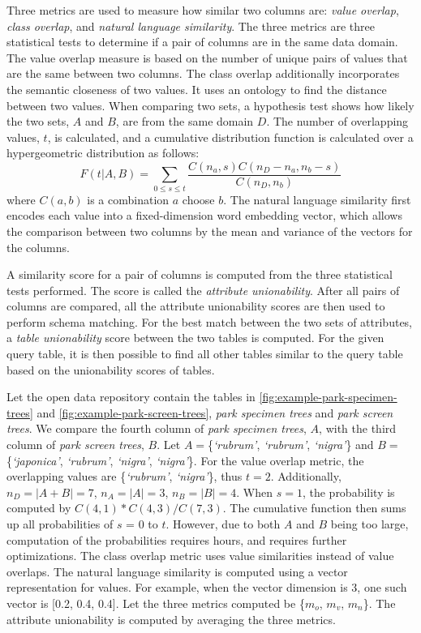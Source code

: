 Three metrics are used to measure how similar two columns are: \textit{value overlap}, \textit{class overlap}, and \textit{natural language similarity}. The three metrics are three statistical tests to determine if a pair of columns are in the same data domain. The value overlap measure is based on the number of unique pairs of values that are the same between two columns. The class overlap additionally incorporates the semantic closeness of two values. It uses an ontology to find the distance between two values. When comparing two sets, a hypothesis test shows how likely the two sets, $A$ and $B$, are from the same domain $D$. The number of overlapping values, $t$, is calculated, and a cumulative distribution function is calculated over a hypergeometric distribution as follows:
\[
F(t|A,B) = \sum\limits _{0\le s\le t}\frac{C(n_{a},s)C(n_{D}-n_{a},n_{b}-s)}{C(n_{D},n_{b})}
\]
where $C(a, b)$ is a combination $a$ choose $b$. The natural language similarity first encodes each value into a fixed-dimension word embedding vector, which allows the comparison between two columns by the mean and variance of the vectors for the columns.

A similarity score for a pair of columns is computed from the three statistical tests performed. The score is called the \textit{attribute unionability}. After all pairs of columns are compared, all the attribute unionability scores are then used to perform schema matching. For the best match between the two sets of attributes, a \textit{table unionability} score between the two tables is computed. For the given query table, it is then possible to find all other tables similar to the query table based on the unionability scores of tables.

Let the open data repository contain the tables in \autoref{fig:example-park-specimen-trees} and \autoref{fig:example-park-screen-trees}, \textit{park specimen trees} and \textit{park screen trees}. We compare the fourth column of \textit{park specimen trees}, $A$, with the third column of \textit{park screen trees}, $B$. Let $A=$\{\textit{`rubrum'}, \textit{`rubrum'}, \textit{`nigra'}\} and $B=$\{\textit{`japonica'}, \textit{`rubrum'}, \textit{`nigra'}, \textit{`nigra'}\}. For the value overlap metric, the overlapping values are \{\textit{`rubrum'}, \textit{`nigra'}\}, thus $t=2$. Additionally, $n_D=|A+B|=7$, $n_A=|A|=3$, $n_B=|B|=4$. When $s=1$, the probability is computed by $C(4, 1) * C(4, 3) / C(7, 3)$. The cumulative function then sums up all probabilities of $s$ = 0 to $t$. However, due to both $A$ and $B$ being too large, computation of the probabilities requires hours, and requires further optimizations. The class overlap metric uses value similarities instead of value overlaps. The natural language similarity is computed using a vector representation for values. For example, when the vector dimension is 3, one such vector is [0.2, 0.4, 0.4]. Let the three metrics computed be \{$m_o$, $m_v$, $m_n$\}. The attribute unionability is computed by averaging the three metrics.

